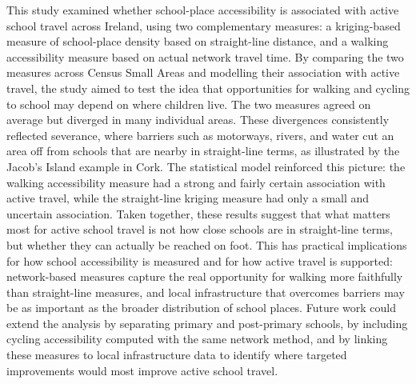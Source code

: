 \documentclass{article}
\begin{document}
This study examined whether school-place accessibility is associated
with active school travel across Ireland, using two complementary
measures: a kriging-based measure of school-place density based on
straight-line distance, and a walking accessibility measure based on
actual network travel time. By comparing the two measures across Census
Small Areas and modelling their association with active travel, the
study aimed to test the idea that opportunities for walking and cycling
to school may depend on where children live. The two measures agreed on
average but diverged in many individual areas. These divergences
consistently reflected severance, where barriers such as motorways,
rivers, and water cut an area off from schools that are nearby in
straight-line terms, as illustrated by the Jacob's Island example in
Cork. The statistical model reinforced this picture: the walking
accessibility measure had a strong and fairly certain association with
active travel, while the straight-line kriging measure had only a small
and uncertain association. Taken together, these results suggest that
what matters most for active school travel is not how close schools are
in straight-line terms, but whether they can actually be reached on
foot. This has practical implications for how school accessibility is
measured and for how active travel is supported: network-based measures
capture the real opportunity for walking more faithfully than
straight-line measures, and local infrastructure that overcomes barriers
may be as important as the broader distribution of school places. Future
work could extend the analysis by separating primary and post-primary
schools, by including cycling accessibility computed with the same
network method, and by linking these measures to local infrastructure
data to identify where targeted improvements would most improve active
school travel.
\end{document}
